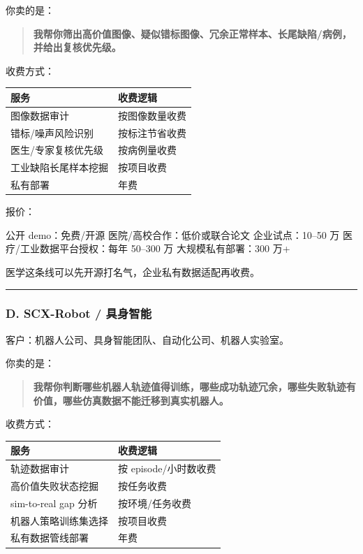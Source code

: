 \documentclass[
  12pt,
]{ctexart}
\newenvironment{Shaded}{}{}
\newcommand{\NormalTok}[1]{#1}
\begin{document}
你卖的是：

\begin{quote}
\textbf{我帮你筛出高价值图像、疑似错标图像、冗余正常样本、长尾缺陷/病例，并给出复核优先级。}
\end{quote}

收费方式：

\begin{longtable}[]{@{}ll@{}}
\toprule\noalign{}
服务 & 收费逻辑 \\
\midrule\noalign{}
\endhead
\bottomrule\noalign{}
\endlastfoot
图像数据审计 & 按图像数量收费 \\
错标/噪声风险识别 & 按标注节省收费 \\
医生/专家复核优先级 & 按病例量收费 \\
工业缺陷长尾样本挖掘 & 按项目收费 \\
私有部署 & 年费 \\
\end{longtable}

报价：

\begin{Shaded}
\begin{Highlighting}[]
\NormalTok{公开 demo：免费/开源}
\NormalTok{医院/高校合作：低价或联合论文}
\NormalTok{企业试点：10–50 万}
\NormalTok{医疗/工业数据平台授权：每年 50–300 万}
\NormalTok{大规模私有部署：300 万+}
\end{Highlighting}
\end{Shaded}

医学这条线可以先开源打名气，企业私有数据适配再收费。

\begin{center}\rule{0.5\linewidth}{0.5pt}\end{center}

\subsubsection{D. SCX-Robot /
具身智能}\label{d.-scx-robot-ux5177ux8eabux667aux80fd}

客户：机器人公司、具身智能团队、自动化公司、机器人实验室。

你卖的是：

\begin{quote}
\textbf{我帮你判断哪些机器人轨迹值得训练，哪些成功轨迹冗余，哪些失败轨迹有价值，哪些仿真数据不能迁移到真实机器人。}
\end{quote}

收费方式：

\begin{longtable}[]{@{}ll@{}}
\toprule\noalign{}
服务 & 收费逻辑 \\
\midrule\noalign{}
\endhead
\bottomrule\noalign{}
\endlastfoot
轨迹数据审计 & 按 episode/小时数收费 \\
高价值失败状态挖掘 & 按任务收费 \\
sim-to-real gap 分析 & 按环境/任务收费 \\
机器人策略训练集选择 & 按项目收费 \\
私有数据管线部署 & 年费 \\
\end{longtable}
\end{document}
